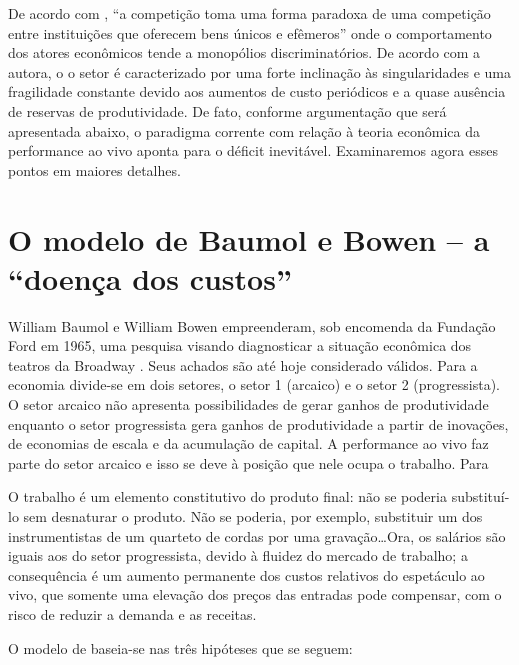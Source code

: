 \documentclass[a4paper, 12pt, openright, oneside, german, french, english, brazil]{abntex2}
\begin{document}
	De acordo com , ``a competição toma uma forma paradoxa de uma competição entre instituições que oferecem bens únicos e efêmeros'' onde o comportamento dos atores econômicos tende a monopólios discriminatórios. De acordo com a autora, o o setor é caracterizado por uma forte inclinação às singularidades e uma fragilidade constante devido aos aumentos de custo periódicos e a quase ausência de reservas de produtividade. De fato, conforme argumentação que será apresentada abaixo, o paradigma corrente com relação à teoria econômica da performance ao vivo aponta para o déficit inevitável. Examinaremos agora esses pontos em maiores detalhes.
	

	\section{O modelo de Baumol e Bowen -- a ``doença dos custos''}

	William Baumol e William Bowen empreenderam, sob encomenda da Fundação Ford em 1965, uma pesquisa visando diagnosticar a situação econômica dos teatros da Broadway \cite{benhamou2007economia}. Seus achados são até hoje considerado válidos. Para  a economia divide-se em dois setores, o setor 1 (arcaico) e o setor 2 (progressista). O setor arcaico não apresenta possibilidades de gerar ganhos de produtividade enquanto o setor progressista gera ganhos de produtividade a partir de inovações, de economias de escala e da acumulação de capital. A performance ao vivo faz parte do setor arcaico e isso se deve à posição que nele ocupa o trabalho. Para 

	\begin{citacao}
		O trabalho é um elemento constitutivo do produto final: não se poderia substituí-lo sem desnaturar o produto. Não se poderia, por exemplo, substituir um dos instrumentistas de um quarteto de cordas por uma gravação\ldots Ora, os salários são iguais aos do setor progressista, devido à fluidez do mercado de trabalho; a consequência é um aumento permanente dos custos relativos do espetáculo ao vivo, que somente uma elevação dos preços das entradas pode compensar, com o risco de reduzir a demanda e as receitas.
	\end{citacao}

	O modelo de  baseia-se nas três hipóteses que se seguem:
\end{document}
